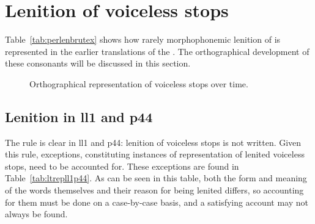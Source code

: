 \section{Lenition of voiceless stops}
\label{sec:lenit-voic-stops}

Table~\ref{tab:perlenbrutex} shows how rarely morphophonemic lenition of  is represented in the earlier translations of the . The orthographical development of these consonants will be discussed in this section.

\begin{figure}[h]
  \centering
  \caption{Orthographical representation of voiceless stops over time.}
  \label{fig:linechartbrut}
\end{figure}

\subsection{Lenition in \acrshort{ll1} and \acrshort{p44}}
\label{sec:lenit-acrsh-acrsh}


The rule is clear in \gls{ll1} and \gls{p44}: lenition of voiceless stops is not written.
Given this rule, exceptions, constituting instances of representation of lenited voiceless stops, need to be accounted for.
These exceptions are found in Table~\ref{tab:ltrepll1p44}.
As can be seen in this table, both the form and meaning of the words themselves and their reason for being lenited differs, so accounting for them must be done on a case-by-case basis, and a satisfying account may not always be found.

